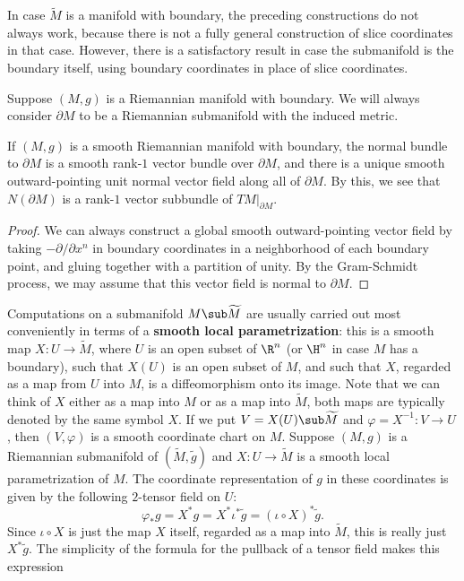In case $\widetilde{M}$ is a manifold with boundary, the preceding constructions do not always work, 
because there is not a fully general construction of slice coordinates in that case. However, there 
is a satisfactory result in case the submanifold is the boundary itself, using boundary coordinates 
in place of slice coordinates.\par
Suppose $(M,g)$ is a Riemannian manifold with boundary. We will always consider $\partial M$ to be a 
Riemannian submanifold with the induced metric.
\begin{proposition}\label{Riemann outward normal}
If $(M,g)$ is a smooth Riemannian manifold with boundary, the normal bundle to $\partial M$ is a 
smooth rank-$1$ vector bundle over $\partial M$, and there is a unique smooth outward-pointing unit 
normal vector field along all of $\partial M$. By this, we see that $N(\partial M)$ is a rank-$1$ 
vector subbundle of $TM|_{\partial M}$.
\end{proposition}
\begin{proof}
We can always construct a global smooth outward-pointing vector field by taking $-\partial/\partial x^n$ 
in boundary coordinates in a neighborhood of each boundary point, and gluing together with a partition 
of unity. By the Gram-Schmidt process, we may assume that this vector field is normal to $\partial M$.
\end{proof}
Computations on a submanifold $M\sub\widetilde{M}$ are usually carried out most conveniently in terms of 
a \textbf{smooth local parametrization}: this is a smooth map $X:U\to\widetilde{M}$, where $U$ is an open 
subset of $\R^n$ (or $\H^n$ in case $M$ has a boundary), such that $X(U)$ is an open subset of $M$, and such 
that $X$, regarded as a map from $U$ into $M$, is a diffeomorphism onto its image. Note that we can think of 
$X$ either as a map into $M$ or as a map into $\widetilde{M}$, both maps are typically denoted by the same 
symbol $X$. If we put $V=X(U)\sub\widetilde{M}$ and $\varphi=X^{-1}:V\to U$, then $(V,\varphi)$ is a smooth 
coordinate chart on $M$.
Suppose $(M,g)$ is a Riemannian submanifold of $(\widetilde{M},\widetilde{g})$ and $X:U\to\widetilde{M}$ is a
smooth local parametrization of $M$. The coordinate representation of $g$ in these coordinates is given by 
the following $2$-tensor field on $U$:
\[\varphi_*g=X^*g=X^*\iota^*\widetilde{g}=(\iota\circ X)^*\widetilde{g}.\]
Since $\iota\circ X$ is just the map $X$ itself, regarded as a map into $\widetilde{M}$, this is really just 
$X^*\widetilde{g}$. The simplicity of the formula for the pullback of a tensor field makes this expression

